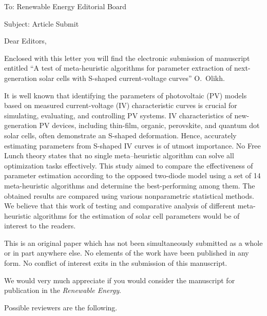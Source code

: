\documentclass[preprint]{elsarticle}
\begin{document}
To:
Renewable Energy Editorial Board


Subject:
Article Submit

\vspace{5mm}
Dear Editors,

\vspace{3mm}
Enclosed with this letter you will find the electronic submission of manuscript entitled
``A test of meta-heuristic algorithms for parameter extraction of next-generation solar cells with S-shaped current-voltage curves'' O.~Olikh.



It is well known that identifying the parameters of photovoltaic (PV) models based on measured current-voltage (IV) characteristic curves
is crucial for simulating, evaluating, and controlling PV systems.
IV characteristics of new-generation PV devices,
including thin-film, organic, perovskite, and quantum dot solar cells, often demonstrate an S-shaped deformation.
Hence, accurately estimating parameters from S-shaped IV curves is of utmost importance.
No Free Lunch theory states that no single meta--heuristic algorithm can solve all optimization tasks effectively.
This study aimed to compare the effectiveness of parameter estimation according to the opposed two-diode model
using a set of 14 meta-heuristic algorithms and determine the best-performing among them.
The obtained results are compared using various nonparametric statistical methods.
We believe that this work of testing and comparative analysis of different meta-heuristic algorithms for the estimation of solar cell parameters
would be of interest to the readers.


This is an original paper which has not been simultaneously submitted as a whole or in part anywhere else.
No elements of the work have been published in any form.
No conflict of interest exits in the submission of this manuscript.


We would  very much appreciate if you would consider the manuscript for publication in the \emph{Renewable Energy}.

Possible reviewers are the following.
\end{document}

